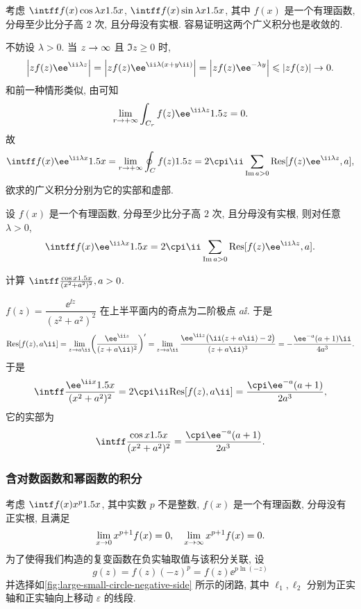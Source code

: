 考虑 $\intff f(x)\cos{\lambda x}\d x$, $\intff f(x)\sin{\lambda x}\d x$, 其中 $f(x)$ 是一个有理函数, 分母至少比分子高 $2$ 次, 且分母没有实根.
容易证明这两个广义积分也是收敛的.

不妨设 $\lambda>0$.
当 $z\rightarrow \infty$ 且 $\Im z\ge 0$ 时, 
  \[
     \abs{zf(z)\ee^{\ii \lambda z}}
    =\abs{zf(z)\ee^{\ii \lambda (x+y\ii)}}
    =\abs{zf(z)\ee^{-\lambda y}}
    \le \abs{zf(z)}\ra 0.
  \]
和前一种情形类似, 由\thmSA 可知
\[
  \lim_{r\ra +\infty}\int_{C_r}f(z)\ee^{\ii \lambda z}\d z=0.
\]
故
\[
   \intff f(x)\ee^{\ii \lambda x}\d x
  =\lim_{r\ra +\infty}\oint_Cf(z)\d z
  =2\cpi\ii\sum_{\Im a>0}\Res[f(z)\ee^{\ii \lambda z},a],
\]
欲求的广义积分分别为它的实部和虚部.

\begin{theorem}
  设 $f(x)$ 是一个有理函数, 分母至少比分子高 $2$ 次, 且分母没有实根, 则对任意 $\lambda>0$,
  \[
     \intff f(x)\ee^{\ii \lambda x}\d x
    =2\cpi\ii\sum_{\Im a>0}\Res[f(z)\ee^{\ii \lambda z},a].
  \]
\end{theorem}

\begin{example}
  计算 $\intff \frac{\cos x\d x}{(x^2+a^2)^2}, a>0$.
\end{example}

\begin{solution}
  $f(z)=\dfrac{\ee^{\ii z}}{(z^2+a^2)^2}$ 在上半平面内的奇点为二阶极点 $a\ii$.
  于是
  \[
     \Res[f(z),a\ii]
    =\lim_{z\ra a\ii}\biggl(\frac{\ee^{\ii z}}{(z+a\ii)^2}\biggr)'
    =\lim_{z\ra a\ii}\frac{\ee^{\ii z}\bigl(\ii(z+a\ii)-2\bigr)}{(z+a\ii)^3}
    =-\frac{\ee^{-a}(a+1)\ii}{4a^3}.
  \]
  于是
  \[
     \intff \frac{\ee^{\ii x}\d x}{(x^2+a^2)^2}
    =2\cpi\ii \Res[f(z),a\ii]=\frac{\cpi \ee^{-a}(a+1)}{2a^3},
  \]
  它的实部为
  \[
     \intff \frac{\cos x\d x}{(x^2+a^2)^2}
    =\frac{\cpi \ee^{-a}(a+1)}{2a^3}.
  \]
\end{solution}


\subsubsection{含对数函数和幂函数的积分}

考虑 $\intf f(x)x^p\d x$, 其中实数 $p$ 不是整数, $f(x)$ 是一个有理函数, 分母没有正实根, 且满足
\[
  \lim_{x\rightarrow 0} x^{p+1}f(x)=0,\quad
  \lim_{x\rightarrow \infty} x^{p+1}f(x)=0.
\]
为了使得我们构造的复变函数在负实轴取值与该积分关联, 设
\[
   g(z)
  =f(z)(-z)^p
  =f(z)\ee^{p\ln(-z)}
\]
并选择如\ref{fig:large-small-circle-negative-side} 所示的闭路, 其中 $\ell_1,\ell_2$ 分别为正实轴和正实轴向上移动 $\varepsilon$ 的线段.


